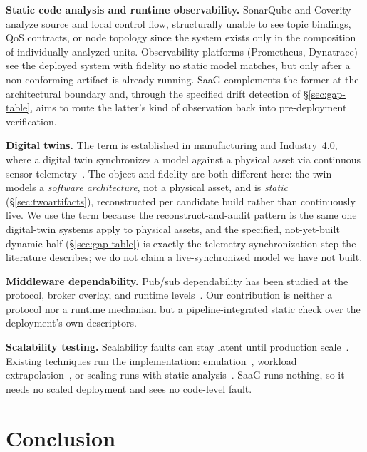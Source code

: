 \documentclass[sigconf,9pt]{acmart}
\begin{document}
\textbf{Static code analysis and runtime observability.} SonarQube and Coverity analyze source and
local control flow, structurally unable to see topic bindings, QoS contracts, or node topology
since the system exists only in the composition of individually-analyzed units. Observability
platforms (Prometheus, Dynatrace) see the deployed system with fidelity no static model matches,
but only after a non-conforming artifact is already running. SaaG complements the former at the
architectural boundary and, through the specified drift detection of \S\ref{sec:gap-table}, aims
to route the latter's kind of observation back into pre-deployment verification.

\textbf{Digital twins.} The term is established in manufacturing and Industry~4.0, where a digital
twin synchronizes a model against a physical asset via continuous sensor
telemetry~\cite{tao2019}. The object and fidelity are both different here: the twin models a
\emph{software architecture}, not a physical asset, and is \emph{static} (\S\ref{sec:twoartifacts}),
reconstructed per candidate build rather than continuously live. We use the term because the
reconstruct-and-audit pattern is the same one digital-twin systems apply to physical assets, and
the specified, not-yet-built dynamic half (\S\ref{sec:gap-table}) is exactly the
telemetry-synchronization step the literature describes; we do not claim a live-synchronized model
we have not built.

\textbf{Middleware dependability.} Pub/sub dependability has been studied at the protocol, broker
overlay, and runtime levels~\cite{eugster2003,carzaniga2001}. Our contribution is neither a
protocol nor a runtime mechanism but a pipeline-integrated static check over the deployment's own
descriptors.

\textbf{Scalability testing.} Scalability faults can stay latent until production
scale~\cite{leesatapornwongsa2017,zhu2026}. Existing techniques run the implementation:
emulation~\cite{gupta2008,wang2014,stuardo2019}, workload extrapolation~\cite{shi2018}, or scaling
runs with static analysis~\cite{zhu2026}. SaaG runs nothing, so it needs no scaled deployment and
sees no code-level fault.


\section{Conclusion}
\label{sec:conclusion}
\end{document}
